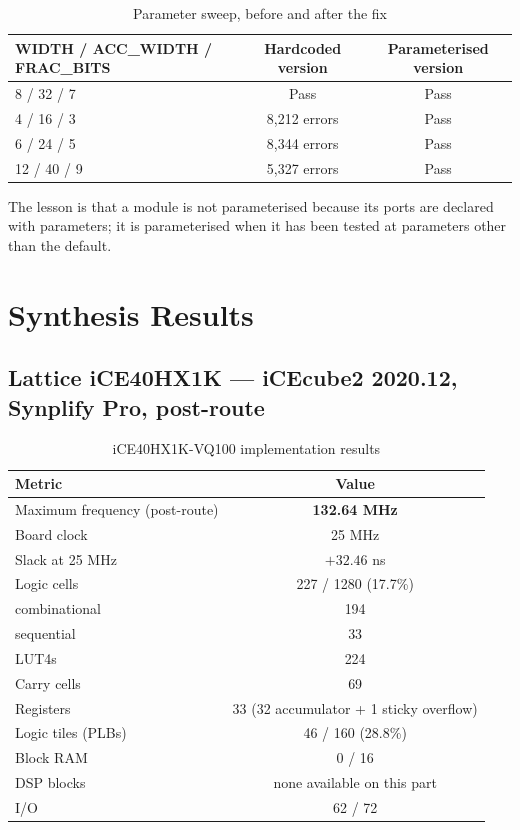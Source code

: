 \documentclass[letterpaper,12pt]{article}
\begin{document}
\begin{table}[H]
\centering
\caption{Parameter sweep, before and after the fix}
\label{tab:sweep}
\renewcommand{\arraystretch}{1.3}
\begin{tabular}{|l|c|c|}
\hline
\textbf{WIDTH / ACC\_WIDTH / FRAC\_BITS} & \textbf{Hardcoded version} & \textbf{Parameterised version} \\
\hline
8 / 32 / 7  & Pass          & Pass \\
4 / 16 / 3  & 8{,}212 errors & Pass \\
6 / 24 / 5  & 8{,}344 errors & Pass \\
12 / 40 / 9 & 5{,}327 errors & Pass \\
\hline
\end{tabular}
\end{table}

The lesson is that a module is not parameterised because its ports are
declared with parameters; it is parameterised when it has been tested at
parameters other than the default.

\section{Synthesis Results}

\subsection{Lattice iCE40HX1K --- iCEcube2 2020.12, Synplify Pro, post-route}

\begin{table}[H]
\centering
\caption{iCE40HX1K-VQ100 implementation results}
\label{tab:ice40}
\renewcommand{\arraystretch}{1.3}
\begin{tabular}{|l|c|}
\hline
\textbf{Metric} & \textbf{Value} \\
\hline
Maximum frequency (post-route) & \textbf{132.64 MHz} \\
Board clock                    & 25 MHz \\
Slack at 25 MHz                & $+32.46$ ns \\
Logic cells                    & 227 / 1280 (17.7\%) \\
\quad combinational            & 194 \\
\quad sequential               & 33 \\
LUT4s                          & 224 \\
Carry cells                    & 69 \\
Registers                      & 33 (32 accumulator + 1 sticky overflow) \\
Logic tiles (PLBs)             & 46 / 160 (28.8\%) \\
Block RAM                      & 0 / 16 \\
DSP blocks                     & none available on this part \\
I/O                            & 62 / 72 \\
\hline
\end{tabular}
\end{table}
\end{document}
